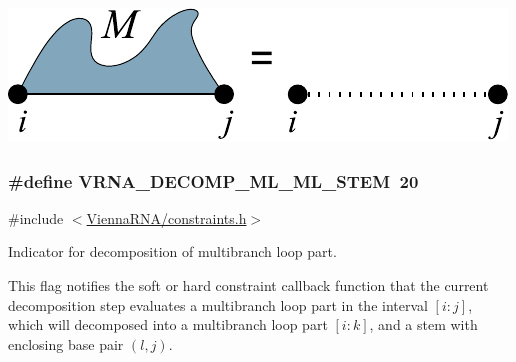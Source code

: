  
\begin{DoxyImageNoCaption}
  \mbox{\includegraphics[width=\textwidth,height=\textheight/2,keepaspectratio=true]{decomp_ml_up}}
\end{DoxyImageNoCaption}
 \hypertarget{group__constraints_ga63d8ceb8c96ae3b463e529e28cc0fe98}{}
\subsubsection[{V\+R\+N\+A\+\_\+\+D\+E\+C\+O\+M\+P\+\_\+\+M\+L\+\_\+\+M\+L\+\_\+\+S\+T\+E\+M}]{\setlength{\rightskip}{0pt plus 5cm}\#define V\+R\+N\+A\+\_\+\+D\+E\+C\+O\+M\+P\+\_\+\+M\+L\+\_\+\+M\+L\+\_\+\+S\+T\+E\+M~20}\label{group__constraints_ga63d8ceb8c96ae3b463e529e28cc0fe98}


{\ttfamily \#include $<$\hyperlink{constraints_8h}{Vienna\+R\+N\+A/constraints.\+h}$>$}



Indicator for decomposition of multibranch loop part. 

This flag notifies the soft or hard constraint callback function that the current decomposition step evaluates a multibranch loop part in the interval $[i:j]$, which will decomposed into a multibranch loop part $[i:k]$, and a stem with enclosing base pair $(l,j)$.

